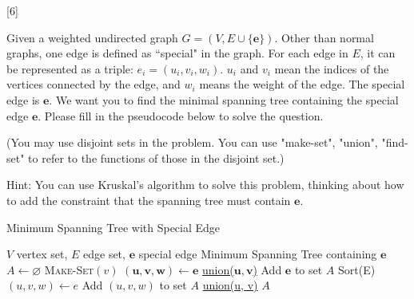 [6]

Given a weighted undirected graph $G=(V, E\cup\{\mathbf{e}\})$. Other than normal graphs, one edge is defined as ``special" in the graph. For each edge in $E$, it can be represented as a triple: $e_i = (u_i,v_i,w_i)$. $u_i$ and $v_i$ mean the indices of the vertices connected by the edge, and $w_i$ means the weight of the edge. The special edge is $\mathbf{e}$. We want you to find the minimal spanning tree containing the special edge $\mathbf{e}$. Please fill in the pseudocode below to solve the question.

(You may use disjoint sets in the problem. You can use "make-set", "union", "find-set" to refer to the functions of those in the disjoint set.)

Hint: You can use Kruskal's algorithm to solve this problem, thinking about how to add the constraint that the spanning tree must contain $\mathbf{e}$.
\begin{algorithm}
    \caption{Minimum Spanning Tree with Special Edge}
    \begin{algorithmic}[1]
        \REQUIRE $V$ vertex set, $E$ edge set, $\mathbf{e}$ special edge
        \ENSURE Minimum Spanning Tree containing $\mathbf{e}$
        \STATE $A \gets \varnothing$
        \STATE \textsc{Make-Set}$(v)$
        \ENDFOR
        \STATE $ (\mathbf u, \mathbf v, \mathbf w) \gets \mathbf{e} $
        \STATE \underline{union($\mathbf{u, v}$)}
        \STATE Add $\mathbf{e}$ to set $A$
        \STATE Sort(E) 
        \STATE $(u, v, w)\gets e$
        \STATE Add $(u, v, w)$ to set $A$
        \STATE \underline{union(u, v)}
        \ENDIF
        \ENDFOR
        \RETURN $A$
    \end{algorithmic}
\end{algorithm}